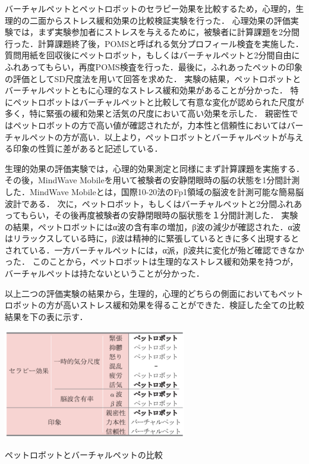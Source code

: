 バーチャルペットとペットロボットのセラピー効果を比較するため，心理的，生理的の二面からストレス緩和効果の比較検証実験を行った．
心理効果の評価実験では，まず実験参加者にストレスを与えるために，被験者に計算課題を2分間行った．計算課題終了後，POMSと呼ばれる気分プロフィール検査を実施した．
質問用紙を回収後にペットロボット，もしくはバーチャルペットと2分間自由にふれあってもらい，再度POMS検査を行った．最後に，ふれあったペットの印象の評価としてSD尺度法を用いて回答を求めた．
実験の結果，ペットロボットとバーチャルペットともに心理的なストレス緩和効果があることが分かった．
特にペットロボットはバーチャルペットと比較して有意な変化が認められた尺度が多く，特に緊張の緩和効果と活気の尺度において高い効果を示した．
親密性ではペットロボットの方で高い値が確認されたが，力本性と信頼性においてはバーチャルペットの方が高い．以上より，ペットロボットとバーチャルペットが与える印象の性質に差があると記述している．

生理的効果の評価実験では，心理的効果測定と同様にまず計算課題を実施する．その後，MindWave Mobileを用いて被験者の安静閉眼時の脳の状態を1分間計測した．MindWave Mobileとは，国際10-20法のFp1領域の脳波を計測可能な簡易脳波計である．
次に，ペットロボット，もしくはバーチャルペットと2分間ふれあってもらい，その後再度被験者の安静閉眼時の脳状態を１分間計測した．
実験の結果，ペットロボットにはα波の含有率の増加，β波の減少が確認された．α波はリラックスしている時に，β波は精神的に緊張しているときに多く出現するとされている．一方バーチャルペットには，α派，β波共に変化が殆ど確認できなかった．
このことから，ペットロボットは生理的なストレス緩和効果を持つが，バーチャルペットは持たないということが分かった．

以上二つの評価実験の結果から，生理的，心理的どちらの側面においてもペットロボットの方が高いストレス緩和効果を得ることができた．検証した全ての比較結果を下の表に示す．

\begin{table}[H]
\centering
\label{table:cal}
\includegraphics[width=8cm]{images/先行研究6.eps}
\caption{ペットロボットとバーチャルペットの比較}
\end{table}

